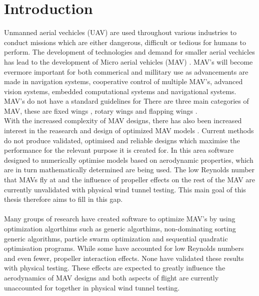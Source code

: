 \graphicspath{{./Figs/}}

\chapter{Introduction} 
\label{sec:Background}


 Unmanned aerial vechicles (UAV) are used throughout various industries to conduct missions which are either dangerous, difficult or tedious for humans to perform. The development of technologies and demand for smaller aerial vechicles has lead to the development of Micro aerial vehicles (MAV) \cite{NONAMI2007}. MAV's will become evermore important for both commerical \cite{Liu2014} and millitary \cite{Chaturvedi2019} \cite{Fan2018} use as advancements are made in navigation systems, cooperative control of multiple MAV's, advanced vision systems, embedded computational systems and navigational systems.\\

 MAV's do not have a standard guidelines for 
 There are three main categories of MAV, these are fixed wings \cite{}, rotary wings \cite{} and flapping wings \cite{}.
\\
With the increased complexity of MAV designs, there has also been increased interest in the reasearch and design of optimized MAV models \cite{Ward2017}. Current methods  do not produce validated, optimised and reliable designs which maximise the performance for the relevant purpose it is created for. In this area software designed to numerically optimise models based on aerodynamic properties, which are in turn mathematically determined are being used. The low Reynolds number that MAVs fly at and the influence of propeller effects on the rest of the MAV are currently unvalidated with physical wind tunnel testing. This main goal of this thesis therefore aims to fill in this gap.\\
\\
Many groups of research have  created software to optimize MAV's by using optimization algorthims such as generic algorthims, non-dominating sorting generic algorithms, particle swarm optimization and sequential quadratic optimisation programs. While some have accounted for low Reynolds numbers and even fewer, propeller interaction effects. None have validated these results with physical testing. These effects are expected to greatly influence the aerodynamics of MAV designs and both aspects of flight are currently unaccounted for together in physical wind tunnel testing.

